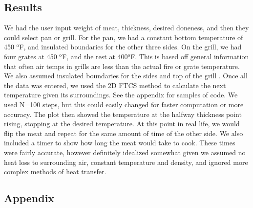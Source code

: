 \documentclass[12pt]{article}
\begin{document}
\subsection*{Results}
We had the user input weight of meat, thickness, desired doneness, and then they could select pan or grill. For the pan, we had a constant bottom temperature of 450 $^\textrm{o}$F, and insulated boundaries for the other three sides. On the grill, we had four grates at 450 $^\textrm{o}$F, and the rest at 400$^\textrm{o}$F. This is based off general information that often air temps in grills are less than the actual fire or grate temperature. We also assumed insulated boundaries for the sides and top of the grill
. 
Once all the data was entered, we used the 2D FTCS method to calculate the next temperature given its surroundings. See the appendix for samples of code. We used N=100 steps, but this could easily changed for faster computation or more accuracy. The plot then showed the temperature at the halfway thickness point rising, stopping at the desired temperature. At this point in real life, we would flip the meat and repeat for the same amount of time of the other side. We also included a timer to show how long the meat would take to cook. These times were fairly accurate, however definitely idealized somewhat given we assumed no heat loss to surrounding air, constant temperature and density, and ignored more complex methods of heat transfer.





\subsection*{Appendix}


\end{document}
